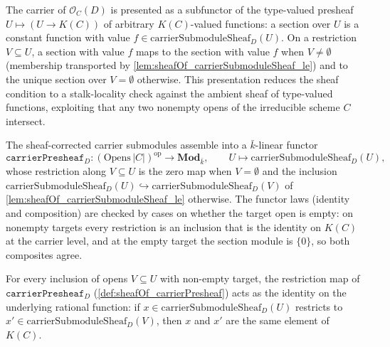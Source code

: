 \begin{definition}

  \label{def:sheafOf_carrierTypeSubfunctor}
  The carrier of \(\mathcal O_C(D)\) is presented as a subfunctor of the
  type-valued presheaf \(U \mapsto (U \to K(C))\) of arbitrary
  \(K(C)\)-valued functions: a section over \(U\) is a constant function
  with value \(f \in \mathrm{carrierSubmoduleSheaf}_D(U)\). On a restriction
  \(V \subseteq U\), a section with value \(f\) maps to the section with
  value \(f\) when \(V \ne \emptyset\) (membership transported by
  \cref{lem:sheafOf_carrierSubmoduleSheaf_le}) and to the unique section
  over \(V = \emptyset\) otherwise. This presentation reduces the sheaf
  condition to a stalk-locality check against the ambient sheaf of
  type-valued functions, exploiting that any two nonempty opens of the
  irreducible scheme \(C\) intersect.
\end{definition}

\begin{definition}

  \label{def:sheafOf_carrierPresheaf}
  The sheaf-corrected carrier submodules assemble into a
  \(\bar k\)-linear functor
  \[
    \texttt{carrierPresheaf}_D : (\mathrm{Opens}\,|C|)^{\mathrm{op}}
    \longrightarrow \mathbf{Mod}_{\bar k},
    \qquad U \longmapsto \mathrm{carrierSubmoduleSheaf}_D(U),
  \]
  whose restriction along \(V \subseteq U\) is the zero map when
  \(V = \emptyset\) and the inclusion
  \(\mathrm{carrierSubmoduleSheaf}_D(U) \hookrightarrow
  \mathrm{carrierSubmoduleSheaf}_D(V)\) of
  \cref{lem:sheafOf_carrierSubmoduleSheaf_le} otherwise. The functor laws
  (identity and composition) are checked by cases on whether the target
  open is empty: on nonempty targets every restriction is an inclusion that
  is the identity on \(K(C)\) at the carrier level, and at the empty target
  the section module is \(\{0\}\), so both composites agree.
\end{definition}

\begin{lemma}
  \label{lem:carrierPresheaf_map_coe}
  For every inclusion of opens \(V \subseteq U\) with non-empty target, the
  restriction map of \(\texttt{carrierPresheaf}_D\) (\cref{def:sheafOf_carrierPresheaf})
  acts as the identity on the underlying rational function: if \(x \in
  \mathrm{carrierSubmoduleSheaf}_D(U)\) restricts to \(x' \in
  \mathrm{carrierSubmoduleSheaf}_D(V)\), then \(x\) and \(x'\) are the same
  element of \(K(C)\).
\end{lemma}

